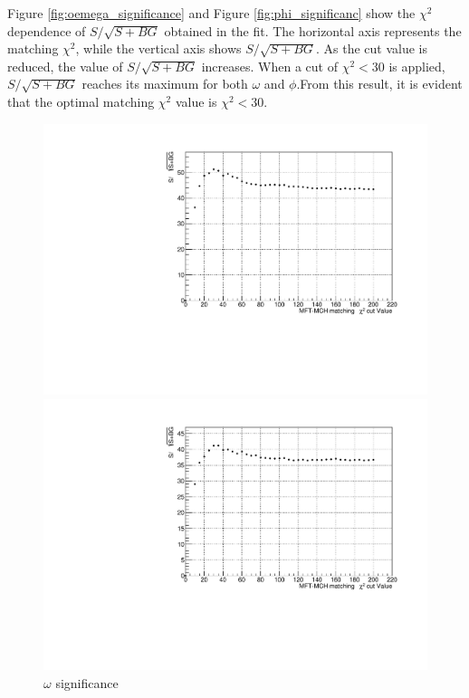             Figure \ref{fig:oemega_significance} and Figure \ref{fig:phi_significanc} show the $\chi^2$ dependence of \(S/\sqrt{S+BG}\) obtained in the fit.
            The horizontal axis represents the matching \(\chi^2\), while the vertical axis shows \(S/\sqrt{S+BG}\). As the cut value is reduced, the value of \(S/\sqrt{S+BG}\) increases. When a cut of \(\chi^2<30\) is applied, \(S/\sqrt{S+BG}\) reaches its maximum for both \(\omega\) and \(\phi\).\@ From this result, it is evident that the optimal matching \(\chi^2\) value is \(\chi^2<30\).\@
            \begin{figure}[htbp]
                \centering
                \begin{minipage}{0.45\textwidth} %
                    \centering
                    \includegraphics[width=\textwidth]{fig/3_4_4_omega_significance.pdf} %
                    \caption{$\omega$ significance}
                    \label{fig:omega_significance}
                \end{minipage}
                \hfill
                \begin{minipage}{0.45\textwidth}
                    \centering
                    \includegraphics[width=\textwidth]{fig/3_4_4_phi_significance.pdf} %

\end{minipage}
\end{figure}
